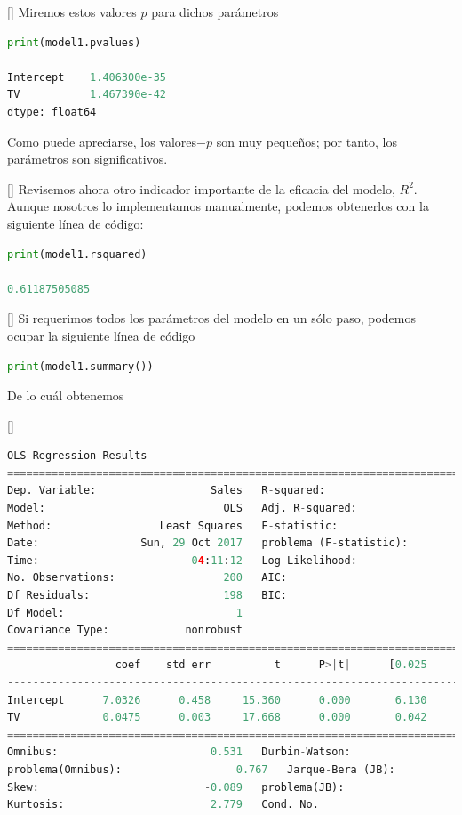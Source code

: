 []
 Miremos estos valores $p$ para dichos parámetros
\begin{lstlisting}[language=Python]
print(model1.pvalues)

Intercept    1.406300e-35
TV           1.467390e-42
dtype: float64
\end{lstlisting}

Como puede apreciarse, los valores$-p$ son muy pequeños; por tanto, los parámetros son significativos.

[]{}
Revisemos ahora otro indicador importante de la eficacia del modelo, $R^{2}.$ Aunque nosotros lo implementamos manualmente, podemos obtenerlos con la siguiente línea de código:
\begin{lstlisting}[language=Python]
print(model1.rsquared)

0.61187505085
\end{lstlisting}


[]{}
Si requerimos todos los parámetros del modelo en un sólo paso, podemos ocupar la siguiente línea de código
\begin{lstlisting}[language=Python]
print(model1.summary())
\end{lstlisting}
De lo cuál obtenemos

[]\tiny
\begin{lstlisting}[language=Python]
                            OLS Regression Results
==============================================================================
Dep. Variable:                  Sales   R-squared:                       0.612
Model:                            OLS   Adj. R-squared:                  0.610
Method:                 Least Squares   F-statistic:                     312.1
Date:                Sun, 29 Oct 2017   problema (F-statistic):           1.47e-42
Time:                        04:11:12   Log-Likelihood:                -519.05
No. Observations:                 200   AIC:                             1042.
Df Residuals:                     198   BIC:                             1049.
Df Model:                           1
Covariance Type:            nonrobust
==============================================================================
                 coef    std err          t      P>|t|      [0.025      0.975]
------------------------------------------------------------------------------
Intercept      7.0326      0.458     15.360      0.000       6.130       7.935
TV             0.0475      0.003     17.668      0.000       0.042       0.053
==============================================================================
Omnibus:                        0.531   Durbin-Watson:                   1.935
problema(Omnibus):                  0.767   Jarque-Bera (JB):                0.669
Skew:                          -0.089   problema(JB):                        0.716
Kurtosis:                       2.779   Cond. No.                         338.
\end{lstlisting}




